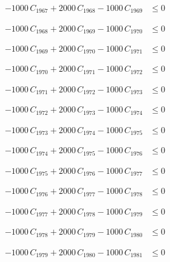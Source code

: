 \documentclass[a4paper,11pt]{article}
\begin{document}
\begin{align}
-1000\,C_{1967} + 2000\,C_{1968} - 1000\,C_{1969} &\leq 0 \nonumber
\end{align}

\begin{align}
-1000\,C_{1968} + 2000\,C_{1969} - 1000\,C_{1970} &\leq 0 \nonumber
\end{align}

\begin{align}
-1000\,C_{1969} + 2000\,C_{1970} - 1000\,C_{1971} &\leq 0 \nonumber
\end{align}

\begin{align}
-1000\,C_{1970} + 2000\,C_{1971} - 1000\,C_{1972} &\leq 0 \nonumber
\end{align}

\begin{align}
-1000\,C_{1971} + 2000\,C_{1972} - 1000\,C_{1973} &\leq 0 \nonumber
\end{align}

\begin{align}
-1000\,C_{1972} + 2000\,C_{1973} - 1000\,C_{1974} &\leq 0 \nonumber
\end{align}

\begin{align}
-1000\,C_{1973} + 2000\,C_{1974} - 1000\,C_{1975} &\leq 0 \nonumber
\end{align}

\begin{align}
-1000\,C_{1974} + 2000\,C_{1975} - 1000\,C_{1976} &\leq 0 \nonumber
\end{align}

\begin{align}
-1000\,C_{1975} + 2000\,C_{1976} - 1000\,C_{1977} &\leq 0 \nonumber
\end{align}

\begin{align}
-1000\,C_{1976} + 2000\,C_{1977} - 1000\,C_{1978} &\leq 0 \nonumber
\end{align}

\begin{align}
-1000\,C_{1977} + 2000\,C_{1978} - 1000\,C_{1979} &\leq 0 \nonumber
\end{align}

\begin{align}
-1000\,C_{1978} + 2000\,C_{1979} - 1000\,C_{1980} &\leq 0 \nonumber
\end{align}

\begin{align}
-1000\,C_{1979} + 2000\,C_{1980} - 1000\,C_{1981} &\leq 0 \nonumber
\end{align}
\end{document}
